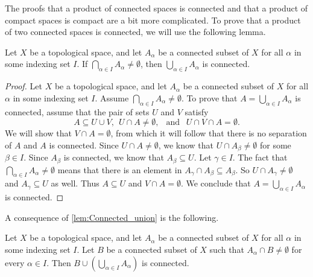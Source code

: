 The proofs that a product of connected spaces is connected and that a product of compact spaces is compact are a bit more complicated. To prove that a product of two connected spaces is connected, we will use the following lemma.

\begin{lemma} \label{lem:Connected_union} Let $X$ be a topological space, and let $A_{\alpha}$ be a connected subset of $X$ for all $\alpha$ in some indexing set $I$. If $\bigcap_{\alpha \in I} A_{\alpha} \neq \emptyset$, then $\bigcup_{\alpha \in I} A_{\alpha}$ is connected. 
\end{lemma}

\begin{proof} Let $X$ be a topological space, and let $A_{\alpha}$ be a connected subset of $X$ for all $\alpha$ in some indexing set $I$. Assume $\bigcap_{\alpha \in I} A_{\alpha} \neq \emptyset$. To prove that $A = \bigcup_{\alpha \in I} A_{\alpha}$ is connected, assume that the pair of sets $U$ and $V$ satisfy
\[A \subseteq U \cup V, \ \ U \cap A \neq \emptyset, \ \ \text{ and  } \ \  U \cap V \cap A = \emptyset.\]
We will show that $V \cap A = \emptyset$, from which it will follow that there is no separation of $A$ and $A$ is connected. Since $U \cap A \neq \emptyset$, we know that $U \cap A_{\beta} \neq \emptyset$ for some $\beta \in I$. Since $A_{\beta}$ is connected, we know that $A_{\beta} \subseteq U$. Let $\gamma \in I$. The fact that $\bigcap_{\alpha \in I} A_{\alpha} \neq \emptyset$ means that there is an element in $A_{\gamma} \cap A_{\beta} \subseteq A_{\beta}$. So $U \cap A_{\gamma} \neq \emptyset$ and $A_{\gamma} \subseteq U$ as well. Thus $A \subseteq U$ and $V \cap A = \emptyset$. We conclude that $A = \bigcup_{\alpha \in I} A_{\alpha}$ is connected.  
\end{proof}
 
A consequence of \ref{lem:Connected_union} is the following.

\begin{corollary} \label{cor:Connected_union} Let $X$ be a topological space, and let $A_{\alpha}$ be a connected subset of $X$ for all $\alpha$ in some indexing set $I$. Let $B$ be a connected subset of $X$ such that $A_{\alpha} \cap B \neq \emptyset$ for every $\alpha \in I$. Then $B \cup \left(\bigcup_{\alpha \in I} A_{\alpha} \right)$ is connected. 
\end{corollary}

